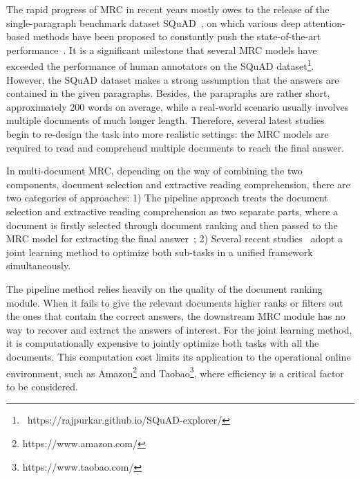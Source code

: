 \documentclass[letterpaper]{article} \usepackage{aaai19}  \usepackage{graphicx}
\begin{document}
The rapid progress of MRC in recent years mostly owes to the release of the single-paragraph benchmark dataset SQuAD~\cite{rajpurkar2016squad}, on which various deep attention-based methods have been proposed to constantly push the state-of-the-art performance~\cite{seo2016bidirectional,wang2017gated,yu2018qanet}. It is a significant milestone that several MRC models have exceeded the performance of human annotators on the SQuAD dataset\footnote{\small{~https://rajpurkar.github.io/SQuAD-explorer/}}. However, the SQuAD dataset makes a strong assumption that the answers are contained in the given paragraphs. Besides, the parapraphs are rather short, approximately 200 words on average, while a real-world scenario usually involves multiple documents of much longer length. Therefore, several latest studies~\cite{joshi2017triviaqa,clark2017simple,tan2017s} begin to re-design the task into more realistic settings: the MRC models are required to read and comprehend multiple documents to reach the final answer.

In multi-document MRC, depending on the way of combining the two components, document selection and extractive reading comprehension, there are two categories of approaches: 1) The pipeline approach treats the document selection and extractive reading comprehension as two separate parts, where a document is firstly selected through document ranking and then passed to the MRC model for extracting the final answer~\cite{joshi2017triviaqa,wang2017r}; 2) Several recent studies~\cite{tan2017s,clark2017simple,wang2018multi} adopt a joint learning method to optimize both sub-tasks in a unified framework simultaneously.

The pipeline method relies heavily on the quality of the document ranking module. When it fails to give the relevant documents higher ranks or filters out the ones that contain the correct answers, the downstream MRC module has no way to recover and extract the answers of interest. For the joint learning method, it is computationally expensive to jointly optimize both tasks with all the documents. This computation cost limits its application to the operational online environment, such as Amazon\footnote{\small{https://www.amazon.com/}} and Taobao\footnote{\small{https://www.taobao.com/}}, where efficiency is a critical factor to be considered. 
\end{document}
